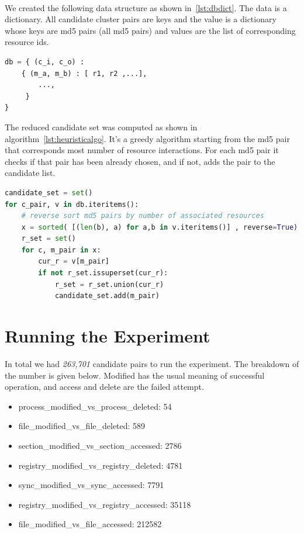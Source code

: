 \\
We created the following data structure as shown in~\ref{lst:dbdict}.
The data is a dictionary. All candidate cluster pairs are keys and the value is a dictionary whose keys are md5 pairs (all md5 pairs) and values are the list of corresponding resource ids.
\\
\begin{lstlisting}[language=python,floatplacement=htpb,caption={Database Structure},label={lst:dbdict}]
db = { (c_i, c_o) :
    { (m_a, m_b) : [ r1, r2 ,...],
        ...,
     }
}
\end{lstlisting}
The reduced candidate set was computed as shown in algorithm~\ref{lst:heuristicalgo}.
It's a greedy algorithm starting from the md5 pair that corresponds most number of resource interactions.
For each md5 pair it checks if that pair has been already chosen, and if not, adds the pair to the candidate list.
\\
\begin{lstlisting}[float,floatplacement=htbp,language=python,caption={Alogrithm to get minimal set of candidates for all resource},label={lst:heuristicalgo}]
candidate_set = set()
for c_pair, v in db.iteritems():
    # reverse sort md5 pairs by number of associated resources
    x = sorted( [(len(b), a) for a,b in v.iteritems()] , reverse=True)
    r_set = set()
    for c, m_pair in x:
        cur_r = v[m_pair]
        if not r_set.issuperset(cur_r):
            r_set = r_set.union(cur_r)
            candidate_set.add(m_pair)
\end{lstlisting}
\section{Running the Experiment}
\label{sec:Running the Experiment}
In total we had \emph{263,701} candidate pairs to run the experiment.
The breakdown of the number is given below.
Modified has the usual meaning of successful operation, and access and delete are the failed attempt.
\begin{itemize}
  \item process\_modified\_vs\_process\_deleted: 54
  \item file\_modified\_vs\_file\_deleted: 589
  \item section\_modified\_vs\_section\_accessed: 2786
  \item registry\_modified\_vs\_registry\_deleted: 4781
  \item sync\_modified\_vs\_sync\_accessed: 7791
  \item registry\_modified\_vs\_registry\_accessed: 35118
  \item file\_modified\_vs\_file\_accessed: 212582
\end{itemize}
